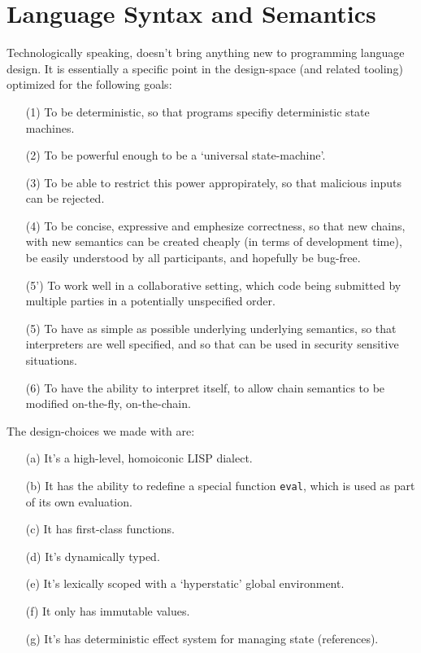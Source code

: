\section{Language Syntax and Semantics}
\label{s:language}

Technologically speaking, \rad doesn't bring anything new to programming
language design. It is essentially a specific point in the design-space (and
related tooling) optimized for the following goals:
\begin{itemize}
\item[(1)] To be deterministic, so that \rad programs specifiy deterministic
  state machines.
\item[(2)] To be powerful enough to be a `universal state-machine'.
\item[(3)] To be able to restrict this power appropirately, so that malicious
  inputs can be rejected.
\item[(4)] To be concise, expressive and emphesize correctness, so that new
  chains, with new semantics can be created cheaply (in terms of development
  time), be easily understood by all participants, and hopefully be bug-free.
\item[(5')] To work well in a collaborative setting, which code being submitted
  by multiple parties in a potentially unspecified order.
\item[(5)] To have as simple as possible underlying underlying semantics, so
  that \rad interpreters are well specified, and so that \rad can be used in
  security sensitive situations.
\item[(6)] To have the ability to interpret itself, to allow chain semantics to
  be modified on-the-fly, on-the-chain.
\end{itemize}

The design-choices we made with \rad are:
\begin{itemize}
\item[(a)] It's a high-level, homoiconic LISP dialect.
\item[(b)] It has the ability to redefine a special function \texttt{eval}, which
  is used as part of its own evaluation.
\item[(c)] It has first-class functions.
\item[(d)] It's dynamically typed.
\item[(e)] It's lexically scoped with a `hyperstatic' global environment.
\item[(f)] It only has immutable values.
\item[(g)] It's has deterministic effect system for managing state (references).
\end{itemize}


